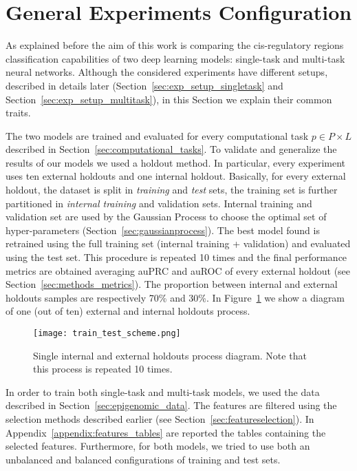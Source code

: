 \section{General Experiments Configuration}
\label{sec:exp_setup_general}
As explained before the aim of this work is comparing the  cis-regulatory regions classification capabilities of two deep learning models: single-task and multi-task neural networks. Although the considered experiments have different setups, described in details later (Section~\ref{sec:exp_setup_singletask} and Section~\ref{sec:exp_setup_multitask}), in this Section we explain their common traits. 

The two models are trained and evaluated for every computational task $p \in P \times L$ described in Section~\ref{sec:computational_tasks}. 
To validate and generalize the results of our
models we used a holdout method. In particular, every experiment uses ten external holdouts and one internal
holdout. Basically, for every external
holdout, the dataset is split in \emph{training} and \emph{test} sets, the
training set is further partitioned in \emph{internal training} and validation
sets. Internal training and validation set are used by the Gaussian Process to
choose the optimal set of hyper-parameters (Section~\ref{sec:gaussianprocess}).
The best model found is retrained using the full training set (internal training + validation) and evaluated using the test set. This procedure is
repeated 10 times and the final performance metrics are obtained averaging auPRC
and auROC of every external holdout (see Section~\ref{sec:methods_metrics}). The proportion between internal and external holdouts samples are respectively 70\% and 30\%. In Figure~\ref{fig:train_test_diagram} we show a diagram of one (out of ten) external and internal holdouts process. 
\begin{figure}[ht]
\centering
\texttt{[image: train\_test\_scheme.png]}
\caption{Single internal and external holdouts process diagram. Note that this
process is repeated 10 times.} 
\label{fig:train_test_diagram}
\end{figure}
In order to train both single-task and multi-task models, we used the data described in Section~\ref{sec:epigenomic_data}. The features are filtered using the selection methods described earlier (see Section~\ref{sec:featureselection}). In Appendix~\ref{appendix:features_tables} are reported the tables containing the selected features. 
Furthermore, for both models, we tried to use both an unbalanced and balanced configurations of training and test sets. 

